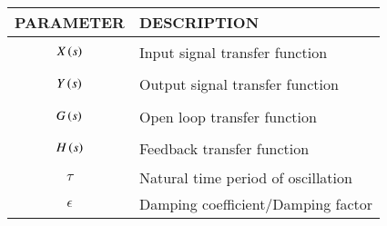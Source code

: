 \begin{tabular}{|p{3cm}|p{5cm}|}
    \hline
    PARAMETER & DESCRIPTION   \\ \hline
    $$X\left(s\right)$$ & Input signal transfer function  \\ \hline
    $$Y\left(s\right)$$ & Output signal transfer function \\ \hline
    $$G\left(s\right)$$ & Open loop transfer function    \\ \hline
    $$H\left(s\right)$$ & Feedback transfer function    \\ \hline
    $$\tau$$ & Natural time period of oscillation  \\ \hline
    $$\epsilon$$ & Damping coefficient/Damping factor  \\ \hline
    \end{tabular}
